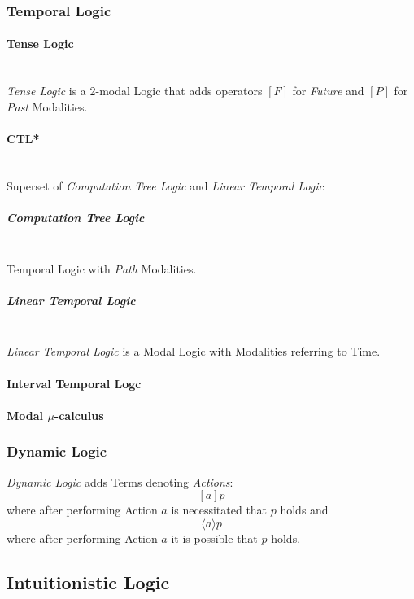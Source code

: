 \documentclass{article}
\begin{document}
\subsubsection{Temporal Logic}

\paragraph{Tense Logic} \hfill \\

\emph{Tense Logic} is a 2-modal Logic that adds operators $[F]$ for
\emph{Future} and $[P]$ for \emph{Past} Modalities.

\paragraph{CTL*}
\hfill \\
Superset of \emph{Computation Tree Logic} and \emph{Linear
  Temporal Logic}

\subparagraph{Computation Tree Logic}
\hfill \\
Temporal Logic with \emph{Path} Modalities.

\subparagraph{Linear Temporal Logic}
\hfill \\
\emph{Linear Temporal Logic} is a Modal Logic with Modalities
referring to Time.

\paragraph{Interval Temporal Logc}

\paragraph{Modal $\mu$-calculus}

\subsubsection{Dynamic Logic}

\emph{Dynamic Logic} adds Terms denoting \emph{Actions}:
\[[a]p\]
where after performing Action $a$ is necessitated that $p$ holds and
\[\langle a \rangle p\]
where after performing Action $a$ it is possible that $p$ holds.

\subsection{Intuitionistic Logic}\label{subsec:intuitionistic_logic}
\end{document}
